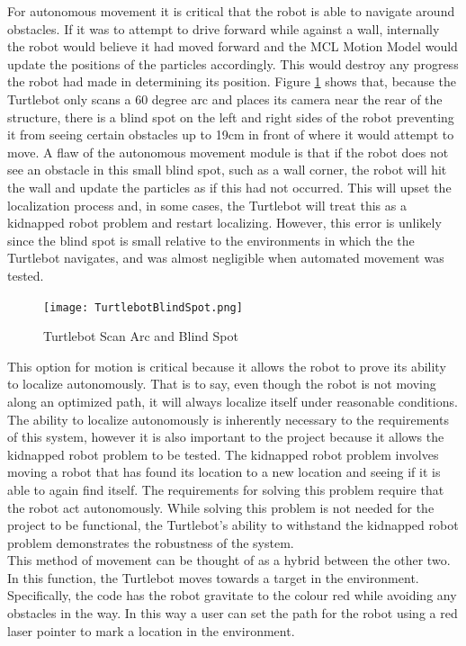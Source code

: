 \documentclass{article}
\newcommand\tab[1][0.5cm]{\hspace*{#1}}
\newcounter{subsubsubsection}[subsubsection]
\begin{document}
For autonomous movement it is critical that the robot is able to navigate around obstacles. If it was to attempt to drive forward while against a wall, internally the robot would believe it had moved forward and the MCL Motion Model would update the positions of the particles accordingly. This would destroy any progress the robot had made in determining its position. Figure \ref{fig:blind} shows that, because the Turtlebot only scans a 60 degree arc and places its camera near the rear of the structure, there is a blind spot on the left and right sides of the robot preventing it from seeing certain obstacles up to 19cm in front of where it would attempt to move. A flaw of the autonomous movement module is that if the robot does not see an obstacle in this small blind spot, such as a wall corner, the robot will hit the wall and update the particles as if this had not occurred. This will upset the localization process and, in some cases, the Turtlebot will treat this as a kidnapped robot problem and restart localizing. However, this error is unlikely since the blind spot is small relative to the environments in which the the Turtlebot navigates, and was almost negligible when automated movement was tested.\\ 

\begin{figure}[h!]
\centering
\texttt{[image: TurtlebotBlindSpot.png]}
\caption{Turtlebot Scan Arc and Blind Spot}
\label{fig:blind}
\end{figure}

This option for motion is critical because it allows the robot to prove its ability to localize autonomously. That is to say, even though the robot is not moving along an optimized path, it will always localize itself under reasonable conditions. The ability to localize autonomously is inherently necessary to the requirements of this system, however it is also important to the project because it allows the kidnapped robot problem to be tested. The kidnapped robot problem involves moving a robot that has found its location to a new location and seeing if it is able to again find itself. The requirements for solving this problem require that the robot act autonomously. While solving this problem is not needed for the project to be functional, the Turtlebot's ability to withstand the kidnapped robot problem demonstrates the robustness of the system.\\

\tab This method of movement can be thought of as a hybrid between the other two. In this function, the Turtlebot moves towards a target in the environment. Specifically, the code has the robot gravitate to the colour red while avoiding any obstacles in the way. In this way a user can set the path for the robot using a red laser pointer to mark a location in the environment.\\
\end{document}
